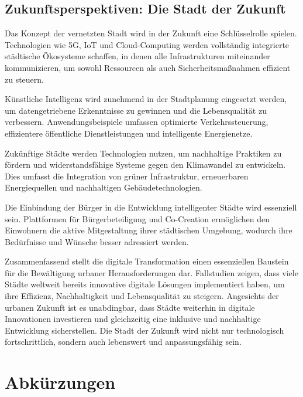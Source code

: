 \documentclass[conference,compsoc,final,a4paper, onecolumn, 11pt]{IEEEtran}
\begin{document}
\subsection{Zukunftsperspektiven: Die Stadt der Zukunft}
Das Konzept der vernetzten Stadt wird in der Zukunft eine Schlüsselrolle spielen. 
Technologien wie 5G, \ac{IoT} und Cloud-Computing werden vollständig integrierte städtische Ökosysteme schaffen, in denen alle Infrastrukturen miteinander kommunizieren, um sowohl Ressourcen als auch Sicherheitsmaßnahmen effizient zu steuern.

Künstliche Intelligenz wird zunehmend in der Stadtplanung eingesetzt werden, um datengetriebene Erkenntnisse zu gewinnen und die Lebensqualität zu verbessern. 
Anwendungsbeispiele umfassen optimierte Verkehrssteuerung, effizientere öffentliche Dienstleistungen und intelligente Energienetze.

Zukünftige Städte werden Technologien nutzen, um nachhaltige Praktiken zu fördern und widerstandsfähige Systeme gegen den Klimawandel zu entwickeln. 
Dies umfasst die Integration von grüner Infrastruktur, erneuerbaren Energiequellen und nachhaltigen Gebäudetechnologien.

Die Einbindung der Bürger in die Entwicklung intelligenter Städte wird essenziell sein. 
Plattformen für Bürgerbeteiligung und Co-Creation ermöglichen den Einwohnern die aktive Mitgestaltung ihrer städtischen Umgebung, wodurch ihre Bedürfnisse und Wünsche besser adressiert werden.

Zusammenfassend stellt die digitale Transformation einen essenziellen Baustein für die Bewältigung urbaner Herausforderungen dar. 
Fallstudien zeigen, dass viele Städte weltweit bereits innovative digitale Lösungen implementiert haben, um ihre Effizienz, Nachhaltigkeit und Lebensqualität zu steigern. 
Angesichts der urbanen Zukunft ist es unabdingbar, dass Städte weiterhin in digitale Innovationen investieren und gleichzeitig eine inklusive und nachhaltige Entwicklung sicherstellen. 
Die Stadt der Zukunft wird nicht nur technologisch fortschrittlich, sondern auch lebenswert und anpassungsfähig sein.


\section*{Abkürzungen}

\begin{acronym}[BIM]
\end{acronym}

\printbibliography
\end{document}
